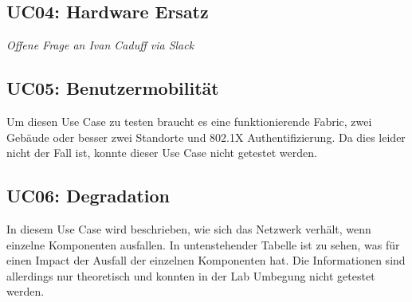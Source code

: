 \begin{landscape}
\subsection{UC04: Hardware Ersatz}
\textit{Offene Frage an Ivan Caduff via Slack}



\subsection{UC05: Benutzermobilität}
Um diesen Use Case zu testen braucht es eine funktionierende Fabric, zwei Gebäude oder besser zwei Standorte und 802.1X Authentifizierung. Da dies leider nicht der Fall ist, konnte dieser Use Case nicht getestet werden. 

\pagebreak
\subsection{UC06: Degradation}
In diesem Use Case wird beschrieben, wie sich das Netzwerk verhält, wenn einzelne Komponenten ausfallen. In untenstehender Tabelle ist zu sehen, was für einen Impact der Ausfall der einzelnen Komponenten hat. Die Informationen sind allerdings nur theoretisch und konnten in der Lab Umbegung nicht getestet werden.
\\


\end{landscape}
